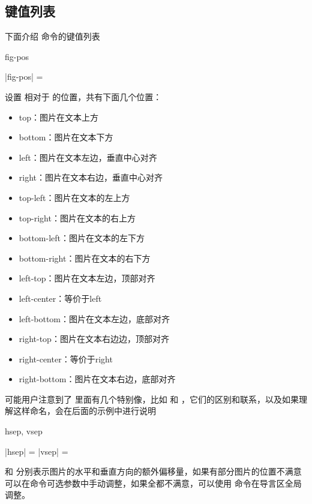 \documentclass{l3doc}
\begin{document}
\subsection{键值列表}
下面介绍  命令的键值列表
\begin{function}[added = 2022-01-22, updated = 2022-01-22]{fig-pos}
  \begin{syntax}
    |fig-pos| =  
  \end{syntax}
  设置  相对于 的位置，共有下面几个位置：
    \begin{itemize}
      \item top：图片在文本上方
      \item bottom：图片在文本下方
      \item left：图片在文本左边，垂直中心对齐
      \item right：图片在文本右边，垂直中心对齐
      \item top-left：图片在文本的左上方
      \item top-right：图片在文本的右上方
      \item bottom-left：图片在文本的左下方
      \item bottom-right：图片在文本的右下方
      \item left-top：图片在文本左边，顶部对齐
      \item left-center：等价于left
      \item left-bottom：图片在文本左边，底部对齐
      \item right-top：图片在文本右边边，顶部对齐
      \item right-center：等价于right
      \item right-bottom：图片在文本右边，底部对齐
    \end{itemize}
  可能用户注意到了  里面有几个特别像，比如  和 ，它们的区别和联系，以及如果理解这样命名，会在后面的示例中进行说明
\end{function}


\begin{function}[added = 2022-01-22]{hsep, vsep}
  \begin{syntax}
    |hsep| =  \init{0pt}
    |vsep| =  \init{0pt}
  \end{syntax}
   和  分别表示图片的水平和垂直方向的额外偏移量，如果有部分图片的位置不满意可以在命令可选参数中手动调整，如果全都不满意，可以使用  命令在导言区全局调整。
\end{function}
\end{document}

